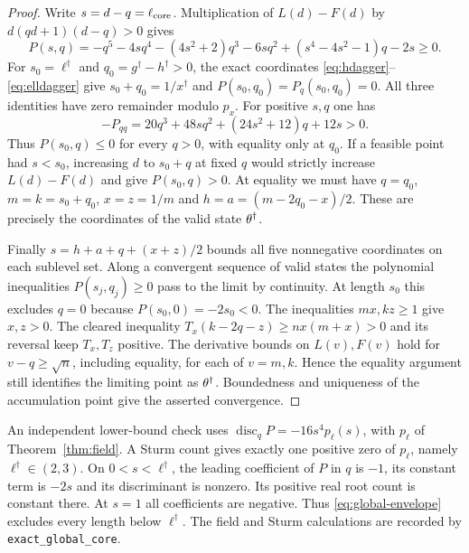 \begin{proof}
Write $s=d-q=\ell_{\mathrm{core}}$. Multiplication of $L(d)-F(d)$ by $d(qd+1)(d-q)>0$ gives
\begin{equation}\label{eq:global-envelope}
 P(s,q)=-q^5-4sq^4-(4s^2+2)q^3-6sq^2+(s^4-4s^2-1)q-2s\ge0 .
\end{equation}
For $s_0=\ell^\dagger$ and $q_0=g^\dagger-h^\dagger>0$, the exact coordinates \eqref{eq:hdagger}--\eqref{eq:elldagger} give $s_0+q_0=1/x^\dagger$ and $P(s_0,q_0)=P_q(s_0,q_0)=0$. All three identities have zero remainder modulo $p_x$. For positive $s,q$ one has
\[
 -P_{qq}=20q^3+48s q^2+(24s^2+12)q+12s>0 .
\]
Thus $P(s_0,q)\le0$ for every $q>0$, with equality only at $q_0$. If a feasible point had $s<s_0$, increasing $d$ to $s_0+q$ at fixed $q$ would strictly increase $L(d)-F(d)$ and give $P(s_0,q)>0$. At equality we must have $q=q_0$, $m=k=s_0+q_0$, $x=z=1/m$ and $h=a=(m-2q_0-x)/2$. These are precisely the coordinates of the valid state $\theta^\dagger$.

Finally $s=h+a+q+(x+z)/2$ bounds all five nonnegative coordinates on each sublevel set. Along a convergent sequence of valid states the polynomial inequalities $P(s_j,q_j)\ge0$ pass to the limit by continuity. At length $s_0$ this excludes $q=0$ because $P(s_0,0)=-2s_0<0$. The inequalities $mx,kz\ge1$ give $x,z>0$. The cleared inequality $T_x(k-2q-z)\ge nx(m+x)>0$ and its reversal keep $T_x,T_z$ positive. The derivative bounds on $L(v),F(v)$ hold for $v-q\ge\sqrt n$, including equality, for each of $v=m,k$. Hence the equality argument still identifies the limiting point as $\theta^\dagger$. Boundedness and uniqueness of the accumulation point give the asserted convergence.
\end{proof}

An independent lower-bound check uses $\operatorname{disc}_qP=-16s^4p_\ell(s)$, with $p_\ell$ of Theorem~\ref{thm:field}. A Sturm count gives exactly one positive zero of $p_\ell$, namely $\ell^\dagger\in(2,3)$. On $0<s<\ell^\dagger$, the leading coefficient of $P$ in $q$ is $-1$, its constant term is $-2s$ and its discriminant is nonzero. Its positive real root count is constant there. At $s=1$ all coefficients are negative. Thus \eqref{eq:global-envelope} excludes every length below $\ell^\dagger$. The field and Sturm calculations are recorded by \texttt{exact\_global\_core}.

